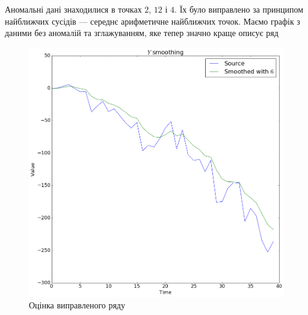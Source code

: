 % 
% 

Аномальні дані знаходилися в точках $2$, $12$ і $4$.
Їх було виправлено за принципом найближчих сусідів ---
середнє арифметичне найближчих точок.
Маємо графік з даними без аномалій та зглажуванням,
яке тепер значно краще описує ряд

\begin{figure}[h!]
  \centering
  \includegraphics[width=\textwidth]{Coursework_files/Coursework_21_0.png}
  \caption{Оцінка виправленого ряду}
  \label{fig:anomaly:fixed}
\end{figure}

